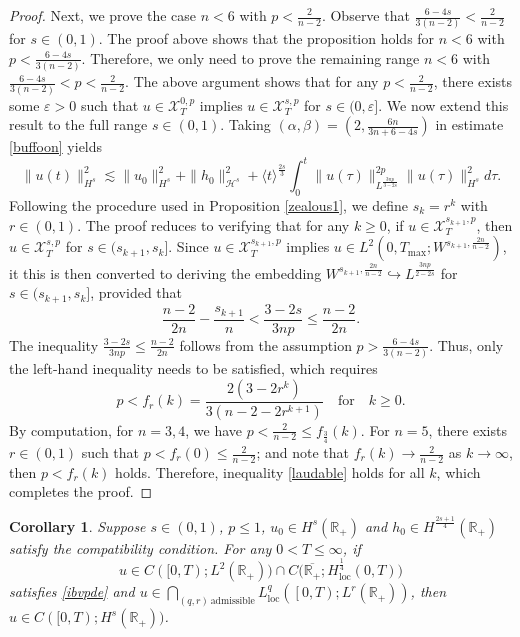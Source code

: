 \documentclass[preprint,compress,12pt]{elsarticle}
\newtheorem{corollary}[theorem]{Corollary}
\numberwithin{equation}{section}
\begin{document}
\begin{proof}
Next, we prove the case $n<6$ with $p<\frac{2}{n-2}$. Observe that  $\frac{6-4s}{3(n-2)}<\frac{2}{n-2}$ for $s\in(0,1)$.  The proof above shows that the proposition holds for $n<6$ with $p<\frac{6-4s}{3(n-2)}$. Therefore, we only need to prove  the remaining range $n<6$ with $\frac{6-4s}{3(n-2)}<p <\frac{2}{n-2}$. The above argument shows that for any  $p<\frac{2}{n-2}$, there exists some $\varepsilon>0$ such that  $u\in\mathscr{X}^{0,p}_{T}$ implies $u\in \mathscr{X}^{s,p}_{T}$ for $s\in (0,\varepsilon]$. We now extend this result to the full range $s\in(0,1)$. Taking $(\alpha,\beta)=\left(2,\frac{6n}{3n+6-4s}\right)$ in estimate \eqref{buffoon} yields
	\begin{equation}
		\|u(t)\|_{H^{s}}^{2}\lesssim \|u_{0}\|_{H^{s}}^{2}+\|h_{0}\|_{\mathcal{H}^{s}}^{2}+ \langle t\rangle^{\frac{2s}{3}} \int_{0}^{t} \|u(\tau)\|_{L^{\frac{3np}{3-2s}}}^{2p} \|u(\tau)\|_{H^{s}}^{2}d\tau.
	\end{equation}
	Following the procedure used in  Proposition \ref{zealous1}, we define $s_{k}=r^{k}$ with $r\in(0,1)$. The proof reduces to verifying that for any $k\geq0$, if $u\in\mathscr{X}^{s_{k+1},p}_{T}$, then $u\in\mathscr{X}^{s,p}_{T}$ for $s\in(s_{k+1},s_{k}]$. Since $u\in\mathscr{X}^{s_{k+1},p}_{T}$ implies $u\in L^{2}(0,T_{\max};W^{s_{k+1},\frac{2n}{n-2}})$, it
	this is then converted to  deriving the embedding $W^{s_{k+1},\frac{2n}{n-2}}\hookrightarrow L^{\frac{3np}{2-2s}}$ for $s\in(s_{k+1},s_{k}]$, provided that
	\begin{equation}\label{laudable}
		\frac{n-2}{2n}-\frac{s_{k+1}}{n}< \frac{3-2s}{3np}\leq \frac{n-2}{2n}.
	\end{equation}
	The inequality  $\frac{3-2s}{3np}\leq \frac{n-2}{2n}$ follows from the assumption $p> \frac{6-4s}{3(n-2)}$. Thus, only the left-hand inequality needs to be satisfied, which requires
	\begin{equation}
		p< f_{r}(k)=\frac{2(3-2r^{k})}{3(n-2-2r^{k+1})}\quad\text{for}\quad k\geq0 .
	\end{equation}
	By computation, for $n=3,4$, we have $p<\frac{2}{n-2}\leq f_{\frac{3}{4}}(k)$.  For $n=5$, there exists $r\in(0,1)$ such that $p<f_{r}(0)\leq\frac{2}{n-2}$; and note that $f_{r}(k)\rightarrow \frac{2}{n-2}$ as $k\rightarrow\infty$, then $p<f_{r}(k)$ holds. Therefore, inequality \eqref{laudable} holds for all $k$, which completes the proof.
\end{proof}
\begin{corollary}\label{parsimony}
	Suppose $s\in(0,1)$, $p\leq 1$, $u_{0}\in H^{s}(\mathbb{R}_{+})$ and $h_{0}\in H^{\frac{2s+1}{4}}(\mathbb{R}_{+})$ satisfy the compatibility condition. For any $0<T \leq
	\infty$, if
	\begin{equation*}
		u\in  C([0,T);L^{2}(\mathbb{R}_{+}))\cap C\big(\overline{\mathbb{R}_{+}};H^{\frac{1}{4}}_{\mathrm{loc}}(0,T)\big)
	\end{equation*}
	satisfies \eqref{ibvpde} and $u\in\bigcap_{(q,r)\, \text{admissible}} L^{q}_{\mathrm{loc}}\left(\left[0,T\right);L^{r}(\mathbb{R}_{+})\right)$, then $u \in C([0,T);H^{s}(\mathbb{R}_{+}))$.
\end{corollary}
\end{document}
